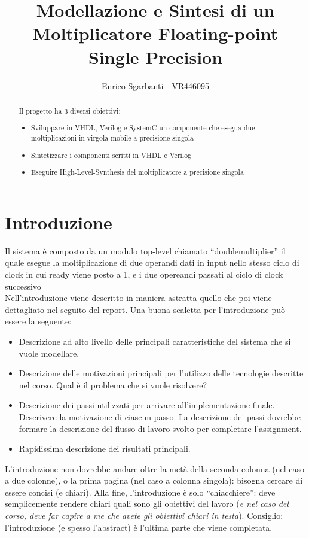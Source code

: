 \documentclass[]{IEEEtran}
\title{Modellazione e Sintesi di un Moltiplicatore Floating-point Single Precision}
\author{Enrico Sgarbanti - VR446095}
\begin{document}
\maketitle

\begin{abstract}
Il progetto ha 3 diversi obiettivi:
\begin{itemize}
\item Sviluppare in VHDL, Verilog e SystemC un componente che esegua due moltiplicazioni in virgola mobile a precisione singola
\item Sintetizzare i componenti scritti in VHDL e Verilog
\item Eseguire High-Level-Synthesis del moltiplicatore a precisione singola
\end{itemize}
\end{abstract}


\section{Introduzione}
Il sistema è composto da un modulo top-level chiamato ``double\textunderscore multiplier'' il quale esegue la moltiplicazione di due operandi dati in input nello stesso ciclo di clock in cui ready viene posto a 1, e i due opereandi passati al ciclo di clock successivo
\\

Nell'introduzione viene descritto in maniera astratta quello che poi viene dettagliato nel seguito del report. Una buona scaletta per l'introduzione può essere la seguente:
\begin{itemize}
\item Descrizione ad alto livello delle principali caratteristiche del sistema che si vuole modellare.
\item Descrizione delle motivazioni principali per l'utilizzo delle tecnologie descritte nel corso. Qual è il problema che si vuole risolvere?
\item Descrizione dei passi utilizzati per arrivare all'implementazione finale. Descrivere la motivazione di ciascun passo. La descrizione dei passi dovrebbe formare la descrizione del flusso di lavoro svolto per completare l'assignment.
\item Rapidissima descrizione dei risultati principali.
\end{itemize}

L'introduzione non dovrebbe andare oltre la metà della seconda colonna (nel caso a due colonne), o la prima pagina (nel caso a colonna singola): bisogna cercare di essere concisi (e chiari). Alla fine, l'introduzione è solo ``chiacchiere'': deve semplicemente rendere chiari quali sono gli obiettivi del lavoro (\emph{e nel caso del corso, deve far capire a me che avete gli obiettivi chiari in testa}). Consiglio: l'introduzione (e spesso l'abstract) è l'ultima parte che viene completata.
\end{document}
